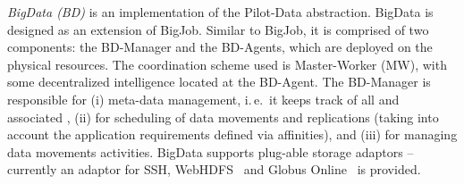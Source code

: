 \documentclass[conference]{IEEEtran}
\begin{document}
{\it BigData (BD)} is an implementation of the Pilot-Data abstraction. BigData
is designed as an extension of BigJob. Similar to BigJob, it is comprised of
two components: the BD-Manager and the BD-Agents, which are deployed on the
physical resources. The coordination scheme used is Master-Worker (MW), with
some decentralized intelligence located at the BD-Agent. The BD-Manager is
responsible for (i) meta-data management, i.\,e.\ it keeps track of all \pd
and associated \dus, (ii) for scheduling of data movements and replications
(taking into account the application requirements defined via affinities), and
(iii) for managing data movements activities. BigData supports plug-able
storage adaptors -- currently an adaptor for SSH, WebHDFS~\cite{webhdfs} and
Globus Online~\cite{10.1109/MIC.2011.64} is provided.






\end{document}
